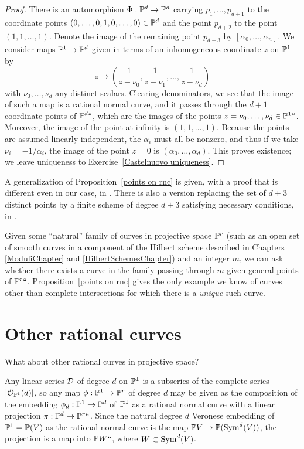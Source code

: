 \begin{proof}
There is an automorphism $\Phi : {\mathbb P}^d \to {\mathbb P}^d$ carrying
$p_1,\dots,p_{d+1}$ to the coordinate points
$(0,\dots,0,1,0,\dots,0)\in {\mathbb P}^d$ and the point $p_{d+2}$ to the
point $(1,1,\dots,1)$.  Denote the image of the remaining  point
$p_{d+3}$  by $[\alpha_0,\dots,\alpha_n]$. We consider maps ${\mathbb P}^1 \to
{\mathbb P}^d$ given in terms of an inhomogeneous coordinate $z$ on ${\mathbb P}^1$ by
$$
z \mapsto \left( \frac{1}{z - \nu_0}, \frac{1}{z - \nu_1} , \dots, \frac{1}{z - \nu_d}  \right)
$$
with $\nu_0,\dots,\nu_d$ any distinct scalars. Clearing denominators,
we see that the image of such a map is a rational normal curve, and it
passes through the $d+1$ coordinate points of ${\mathbb P}^d` `$, which are
the images of the points $z = \nu_0, \dots, \nu_d \in {\mathbb P}^1` `$.
Moreover, the image of the point  at infinity is $(1,1,
\dots,1)$. Because the points are assumed linearly independent, the
$\alpha_i$ must all be nonzero, and thus if we take  $\nu_i =
-1/\alpha_i$, the image of the point $z = 0$ is
$(\alpha_0,\dots,\alpha_d)$. This proves existence; we leave
uniqueness to Exercise~\ref{Castelnuovo uniqueness}.
\unif
\end{proof}

\begin{fact}
A generalization of Proposition~\ref{points on rnc} is given, with a proof that is different
even in our case, in \cite[Proposition 3.19]{Montreal}.  There is also a version replacing the set of $d+3$ distinct points by a  finite
scheme of degree $d+3$ satisfying necessary conditions, in \cite{EHLGP}.
\end{fact}

Given some ``natural''
family of curves in projective space ${\mathbb P}^r$ (such as an open set of smooth
curves in a component of the Hilbert scheme
described in Chapters
\ref{ModuliChapter} and \ref{HilbertSchemesChapter})
and an integer $m$, we can ask whether there exists a curve in the
family passing through $m$ given general points of ${\mathbb P}^r` `$.
Proposition~\ref{points on rnc}
gives the only example we know of curves other than complete
intersections for which there is a \emph{unique} such curve.

\section{Other rational curves}

What about other rational curves in projective space?

Any linear series ${\cal D}$ of degree $d$ on ${\mathbb P}^1$ is a subseries of the complete series $|{\mathcal O}_{{\mathbb P}^1}(d)|$, so any map $\phi : {\mathbb P}^1 \to {\mathbb P}^r$ of degree $d$ may be given as the
composition of the embedding $\phi_d : {\mathbb P}^1 \to {\mathbb P}^d$ of $\kern1pt{\mathbb P}^1$
as a rational normal curve with a linear projection $\pi : {\mathbb P}^d \to
{\mathbb P}^r` `$. Since the natural degree $d$
Veronese embedding
%
of ${\mathbb P}^1 =
{\mathbb P}(V)$ as the rational normal curve is the map
${\mathbb P} V \to {\mathbb P}(\operatorname{Sym}^d(V))$, the projection is a map into ${\mathbb P} W` `$, where $W\subset \operatorname{Sym}^d(V)$.

